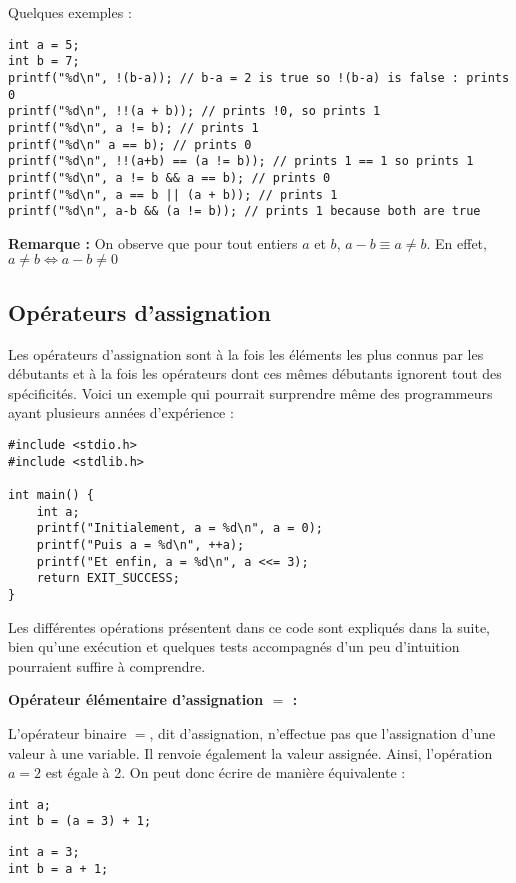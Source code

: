 \documentclass[../../../main.tex]{subfiles}
\begin{document}
Quelques exemples :
\begin{verbatim}
int a = 5;
int b = 7;
printf("%d\n", !(b-a)); // b-a = 2 is true so !(b-a) is false : prints 0
printf("%d\n", !!(a + b)); // prints !0, so prints 1
printf("%d\n", a != b); // prints 1
printf("%d\n" a == b); // prints 0
printf("%d\n", !!(a+b) == (a != b)); // prints 1 == 1 so prints 1
printf("%d\n", a != b && a == b); // prints 0
printf("%d\n", a == b || (a + b)); // prints 1
printf("%d\n", a-b && (a != b)); // prints 1 because both are true
\end{verbatim}
\textbf{Remarque :} On observe que pour tout entiers $a$ et $b$, $a-b\equiv a \neq b$. En effet, $a \neq b \Leftrightarrow a - b \neq{0}$
\subsection{Opérateurs d'assignation}
Les opérateurs d'assignation sont à la fois les éléments les plus connus par les débutants et à la fois les opérateurs dont ces mêmes débutants ignorent tout des spécificités. Voici un exemple qui pourrait surprendre même des programmeurs ayant plusieurs années d'expérience :
\begin{verbatim}
#include <stdio.h>
#include <stdlib.h>

int main() {
	int a;
	printf("Initialement, a = %d\n", a = 0);
	printf("Puis a = %d\n", ++a);
	printf("Et enfin, a = %d\n", a <<= 3);
	return EXIT_SUCCESS;
}
\end{verbatim}
Les différentes opérations présentent dans ce code sont expliqués dans la suite, bien qu'une exécution et quelques tests accompagnés d'un peu d'intuition pourraient suffire à comprendre.
 
\textbf{Opérateur élémentaire d'assignation $=$ :}
 
L'opérateur binaire $=$, dit d'assignation, n'effectue pas que l'assignation d'une valeur à une variable. Il renvoie également la valeur assignée.\newline
Ainsi, l'opération $a = 2$ est égale à 2. On peut donc écrire de manière équivalente :

\begin{minipage}{0.5\textwidth}
\begin{verbatim}
int a;
int b = (a = 3) + 1;
\end{verbatim}
\end{minipage}
\begin{minipage}{0.5\textwidth}
\begin{verbatim}
int a = 3;
int b = a + 1;
\end{verbatim}
\end{minipage}
\end{document}
